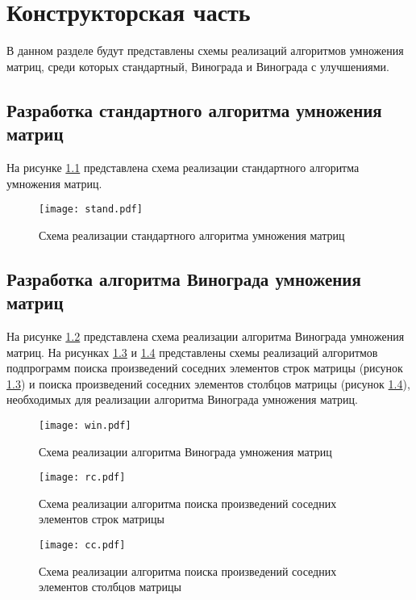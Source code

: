 \chapter{Конструкторская часть}

В данном разделе будут представлены схемы реализаций алгоритмов умножения матриц, среди которых стандартный, Винограда и Винограда с улучшениями.

\section{Разработка стандартного алгоритма умножения матриц}
На рисунке \ref{img:stand} представлена схема реализации стандартного алгоритма умножения матриц.

\begin{figure}[h!]
    \centering
    \texttt{[image: stand.pdf]}
    \caption{Схема реализации стандартного алгоритма умножения матриц}
    \label{img:stand}
\end{figure}

\section{Разработка алгоритма Винограда умножения матриц}
На рисунке \ref{img:win} представлена схема реализации алгоритма Винограда умножения матриц. На рисунках \ref{img:rc} и \ref{img:cc} представлены схемы реализаций алгоритмов подпрограмм поиска произведений соседних элементов строк матрицы (рисунок \ref{img:rc}) и поиска произведений соседних элементов столбцов матрицы (рисунок \ref{img:cc}), необходимых для реализации алгоритма Винограда умножения матриц.

\begin{figure}[h!]
    \centering
    \texttt{[image: win.pdf]}
    \caption{Схема реализации алгоритма Винограда умножения матриц}
    \label{img:win}
\end{figure}

\begin{figure}[h!]
    \centering
    \texttt{[image: rc.pdf]}
    \caption{Схема реализации алгоритма поиска произведений соседних элементов строк матрицы}
    \label{img:rc}
\end{figure}

\begin{figure}[h!]
    \centering
    \texttt{[image: cc.pdf]}
    \caption{Схема реализации алгоритма поиска произведений соседних элементов столбцов матрицы}
    \label{img:cc}
\end{figure}

